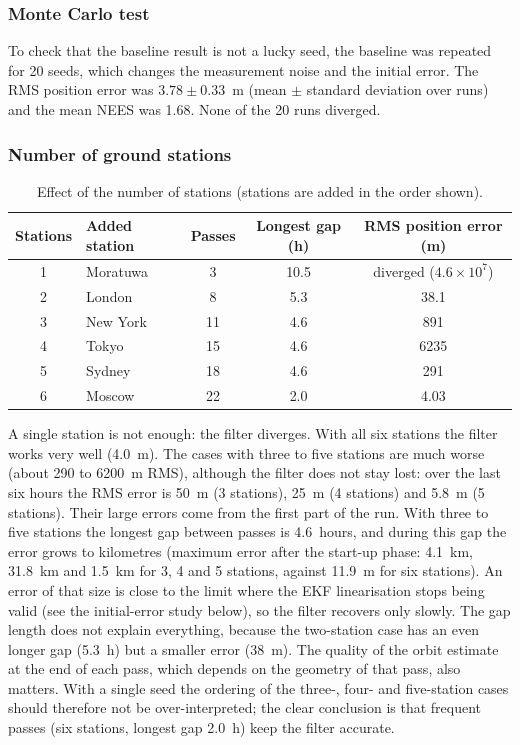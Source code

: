 \documentclass[11pt,a4paper]{article}
\begin{document}
\subsubsection{Monte Carlo test}
To check that the baseline result is not a lucky seed, the baseline was repeated for 20 seeds, which changes the measurement noise and the initial error. The RMS position error was $3.78\pm0.33$~m (mean $\pm$ standard deviation over runs) and the mean NEES was 1.68. None of the 20 runs diverged.

\subsubsection{Number of ground stations}
\begin{table}[H]
\centering
\caption{Effect of the number of stations (stations are added in the order shown).}
\label{tab:stations}
\begin{tabular}{clccc}
\toprule
\textbf{Stations} & \textbf{Added station} & \textbf{Passes} & \textbf{Longest gap (h)} & \textbf{RMS position error (m)} \\
\midrule
1 & Moratuwa  & 3  & 10.5 & diverged ($4.6\times10^{7}$) \\
2 & London    & 8  & 5.3  & 38.1 \\
3 & New York  & 11 & 4.6  & 891 \\
4 & Tokyo     & 15 & 4.6  & 6235 \\
5 & Sydney    & 18 & 4.6  & 291 \\
6 & Moscow    & 22 & 2.0  & 4.03 \\
\bottomrule
\end{tabular}
\end{table}
A single station is not enough: the filter diverges. With all six stations the filter works very well (4.0~m). The cases with three to five stations are much worse (about 290 to 6200~m RMS), although the filter does not stay lost: over the last six hours the RMS error is 50~m (3 stations), 25~m (4 stations) and 5.8~m (5 stations). Their large errors come from the first part of the run. With three to five stations the longest gap between passes is 4.6~hours, and during this gap the error grows to kilometres (maximum error after the start-up phase: 4.1~km, 31.8~km and 1.5~km for 3, 4 and 5 stations, against 11.9~m for six stations). An error of that size is close to the limit where the EKF linearisation stops being valid (see the initial-error study below), so the filter recovers only slowly.
The gap length does not explain everything, because the two-station case has an even longer gap (5.3~h) but a smaller error (38~m). The quality of the orbit estimate at the end of each pass, which depends on the geometry of that pass, also matters. With a single seed the ordering of the three-, four- and five-station cases should therefore not be over-interpreted; the clear conclusion is that frequent passes (six stations, longest gap 2.0~h) keep the filter accurate.
\end{document}

